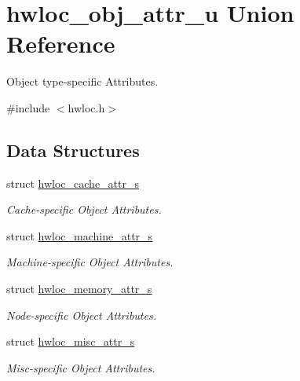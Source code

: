 \hypertarget{unionhwloc__obj__attr__u}{
\section{hwloc\_\-obj\_\-attr\_\-u Union Reference}
\label{unionhwloc__obj__attr__u}
}


Object type-\/specific Attributes.  


{\ttfamily \#include $<$hwloc.h$>$}\subsection*{Data Structures}
\begin{DoxyCompactItemize}
\item 
struct \hyperlink{structhwloc__obj__attr__u_1_1hwloc__cache__attr__s}{hwloc\_\-cache\_\-attr\_\-s}
\begin{DoxyCompactList}\small\item\em Cache-\/specific Object Attributes. \item\end{DoxyCompactList}\item 
struct \hyperlink{structhwloc__obj__attr__u_1_1hwloc__machine__attr__s}{hwloc\_\-machine\_\-attr\_\-s}
\begin{DoxyCompactList}\small\item\em Machine-\/specific Object Attributes. \item\end{DoxyCompactList}\item 
struct \hyperlink{structhwloc__obj__attr__u_1_1hwloc__memory__attr__s}{hwloc\_\-memory\_\-attr\_\-s}
\begin{DoxyCompactList}\small\item\em Node-\/specific Object Attributes. \item\end{DoxyCompactList}\item 
struct \hyperlink{structhwloc__obj__attr__u_1_1hwloc__misc__attr__s}{hwloc\_\-misc\_\-attr\_\-s}
\begin{DoxyCompactList}\small\item\em Misc-\/specific Object Attributes. \item\end{DoxyCompactList}\end{DoxyCompactItemize}
